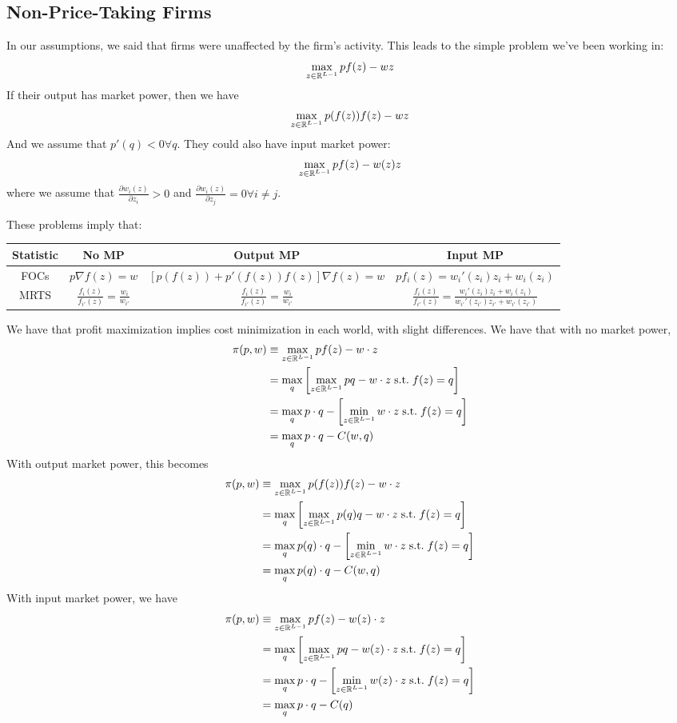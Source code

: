 \documentclass[12pt]{article}
\begin{document}
\subsection{Non-Price-Taking Firms}

In our assumptions, we said that firms were unaffected by the firm's activity. This leads to the simple problem we've been working in:
\[
\max_{z \in \mathbb{R}^{L-1}} pf(z) - wz
\]
If their output has market power, then we have
\[
\max_{z \in \mathbb{R}^{L-1}} p(f(z))f(z) - wz
\]
And we assume that $p'(q) < 0 \forall q$. They could also have input market power:
\[
\max_{z \in \mathbb{R}^{L-1}} pf(z) - w(z)z
\]
where we assume that $\frac{\partial w_i(z)}{\partial z_i} > 0$ and $\frac{\partial w_i(z)}{\partial z_j} = 0 \forall i \ne j$. 


These problems imply that:
\begin{center}
	\begin{tabular}{| c | c | c | c | }
		\hline
		 Statistic & No MP & Output MP & Input MP \\
		 \hline
		 FOCs & $p \nabla f(z) = w$ & $[p(f(z)) + p'(f(z))f(z)] \nabla f(z) = w$ & $p f_i(z) = w_i'(z_i)z_i + w_i(z_i)$\\
		 \hline
		 MRTS & $\frac{f_i(z)}{f_{i'}(z)} = \frac{w_i}{w_{i'}}$ & $\frac{f_i(z)}{f_{i'}(z)} = \frac{w_i}{w_{i'}}$ & $\frac{f_i(z)}{f_{i'}(z)} = \frac{w_i'(z_i)z_i + w_i(z_i)}{w_{i'}'(z_{i'})z_{i'} + w_{i'}(z_{i'})}$\\
		 \hline
	\end{tabular}
\end{center}

We have that profit maximization implies cost minimization in each world, with slight differences. We have that with no market power,
\begin{align*}
	\pi(p,w) &\equiv \max_{z \in \mathbb{R}^{L-1}} pf(z) - w \cdot z \\
	&= \max_q \left[ \max_{z \in \mathbb{R}^{L-1}} pq - w \cdot z \;\text{s.t.}\; f(z) = q \right] \\
	&= \max_q p\cdot q - \left[ \min_{z \in \mathbb{R}^{L-1}} w \cdot z \;\text{s.t.}\; f(z) = q \right] \\
	&=  \max_q p\cdot q - C(w,q)
\end{align*}
With output market power, this becomes
\begin{align*}
	\pi(p,w) &\equiv \max_{z \in \mathbb{R}^{L-1}} p(f(z))f(z) - w \cdot z \\
	&= \max_q \left[ \max_{z \in \mathbb{R}^{L-1}} p(q)q - w \cdot z \;\text{s.t.}\; f(z) = q \right] \\
	&= \max_q p(q)\cdot q - \left[ \min_{z \in \mathbb{R}^{L-1}} w \cdot z \;\text{s.t.}\; f(z) = q \right] \\
	&=  \max_q p(q)\cdot q - C(w,q)
\end{align*}
With input market power, we have
\begin{align*}
	\pi(p,w) &\equiv \max_{z \in \mathbb{R}^{L-1}} pf(z) - w(z) \cdot z \\
	&= \max_q \left[ \max_{z \in \mathbb{R}^{L-1}} pq - w(z) \cdot z \;\text{s.t.}\; f(z) = q \right] \\
	&= \max_q p\cdot q - \left[ \min_{z \in \mathbb{R}^{L-1}} w(z) \cdot z \;\text{s.t.}\; f(z) = q \right] \\
	&=  \max_q p\cdot q - C(q)
\end{align*}
\end{document}
